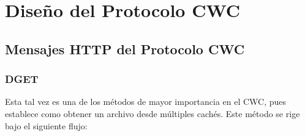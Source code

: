 
\chapter{Diseño del Protocolo CWC} %

\label{ch:diseno_protocolo_cwc} %


\section{Mensajes HTTP del Protocolo CWC}

\subsection{DGET}
Esta tal vez es una de los métodos de mayor importancia en el CWC, pues establece como obtener un archivo desde múltiples cachés. Este método se rige bajo el siguiente flujo:

